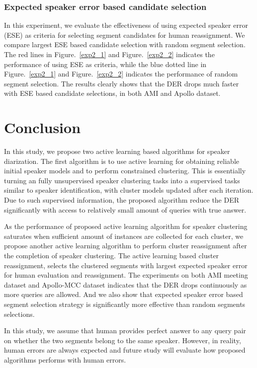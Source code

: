 \documentclass[journal,10pt]{IEEEtran}
\begin{document}
\subsubsection{Expected speaker error based candidate selection}
In this experiment, we evaluate the effectiveness of using expected speaker error (ESE) as criteria for selecting segment candidates for human reassignment. We compare largest ESE based candidate selection with random segment selection. The red lines in Figure.~\ref{exp2_1} and Figure.~\ref{exp2_2} indicates the performance of using ESE as criteria, while the blue dotted line in Figure.~\ref{exp2_1} and Figure.~\ref{exp2_2} indicates the performance of random segment selection. The results clearly shows that the DER drops much faster with ESE based candidate selections, in both AMI and Apollo dataset.

\section{Conclusion}
\label{con}

In this study, we propose two active learning based algorithms for speaker diarization. The first algorithm is to use active learning for obtaining reliable initial speaker models and to perform constrained clustering. This is essentially turning an fully unsupervised speaker clustering tasks into a supervised tasks similar to speaker identification, with cluster models updated after each iteration. Due to such supervised information, the proposed algorithm reduce the DER significantly with access to relatively small amount of queries with true answer. 

As the performance of proposed active learning algorithm for speaker clustering saturates when sufficient amount of instances are collected for each cluster, we propose another active learning algorithm to perform cluster reassignment after the completion of speaker clustering. The active learning based cluster reassignment, selects the clustered segments with largest expected speaker error for human evaluation and reassignment. The experiments on both AMI meeting dataset and Apollo-MCC dataset indicates that the DER drops continuously as more queries are allowed. And we also show that expected speaker error based segment selection strategy is significantly more effective than random segments selections. 

In this study, we assume that human provides perfect answer to any query pair on whether the two segments belong to the same speaker. However, in reality, human errors are always expected and future study will evaluate how proposed algorithms performs with human errors.
\end{document}
